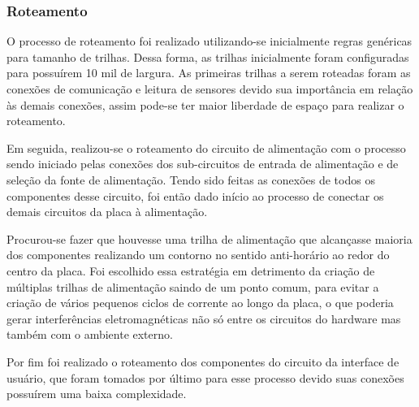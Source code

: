 \subsubsection{Roteamento}

O processo de roteamento foi realizado utilizando-se inicialmente regras genéricas para tamanho de trilhas. Dessa forma, as trilhas inicialmente foram configuradas para possuírem 10 mil de largura. As primeiras trilhas a serem roteadas foram as conexões de comunicação e leitura de sensores devido sua importância em relação às demais conexões, assim pode-se ter maior liberdade de espaço para realizar o roteamento. 

Em seguida, realizou-se o roteamento do circuito de alimentação com o processo sendo iniciado pelas conexões dos sub-circuitos de entrada de alimentação e de seleção da fonte de alimentação. Tendo sido feitas as conexões de todos os componentes desse circuito, foi então dado início ao processo de conectar os demais circuitos da placa à alimentação.

Procurou-se fazer que houvesse uma trilha de alimentação que alcançasse maioria dos componentes realizando um contorno no sentido anti-horário ao redor do centro da placa. Foi escolhido essa estratégia em detrimento da criação de múltiplas trilhas de alimentação saindo de um ponto comum, para evitar a criação de vários pequenos ciclos de corrente ao longo da placa, o que poderia gerar interferências eletromagnéticas não só entre os circuitos do hardware mas também com o ambiente externo. 

Por fim foi realizado o roteamento dos componentes do circuito da interface de usuário, que foram tomados por último para esse processo devido suas conexões possuírem uma baixa complexidade. 













